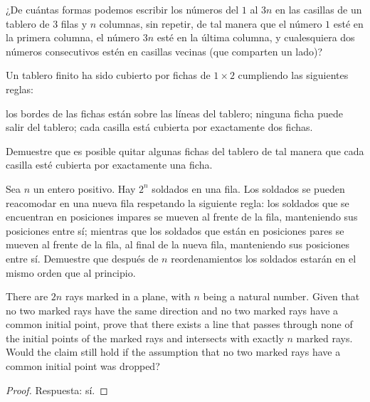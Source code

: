 \begin{probEG}
	¿De cuántas formas podemos escribir los números del $1$ al $3n$ en las casillas de un tablero de $3$ filas y $n$ columnas, sin repetir, de tal manera que el número $1$ esté en la primera columna, el número $3n$ esté en la última columna, y cualesquiera dos números consecutivos estén en casillas vecinas (que comparten un lado)?
\end{probEG}

\begin{probEG}
	Un tablero finito ha sido cubierto por fichas de $1\times 2$ cumpliendo las siguientes reglas:
	\begin{itemize}
		\ii los bordes de las fichas están sobre las líneas del tablero;
		\ii ninguna ficha puede salir del tablero;
		\ii cada casilla está cubierta por exactamente dos fichas.
	\end{itemize}
	Demuestre que es posible quitar algunas fichas del tablero de tal manera que cada casilla esté cubierta por exactamente una ficha.
\end{probEG}

\begin{probEG}
	Sea $n$ un entero positivo. Hay $2^n$ soldados en una fila. Los soldados se pueden reacomodar en una nueva fila respetando la siguiente regla: los soldados que se encuentran en posiciones impares se mueven al frente de la fila, manteniendo sus posiciones entre sí; mientras que los soldados que están en posiciones pares se mueven al frente de la fila, al final de la nueva fila, manteniendo sus posiciones entre sí. Demuestre que después de $n$ reordenamientos los soldados estarán en el mismo orden que al principio.
\end{probEG}

\begin{probMG}
	\begin{enumerate}[(a)]
		\ii There are $2n$ rays marked in a plane, with $n$ being a natural number. Given that no two marked rays have the same direction and no two marked rays have a common initial point, prove that there exists a line that passes through none of the initial points of the marked rays and intersects with exactly $n$ marked rays.
		\ii Would the claim still hold if the assumption that no two marked rays have a common initial point was dropped?
	\end{enumerate}
\end{probMG}

\begin{proof}
	Respuesta: sí.
\end{proof}

